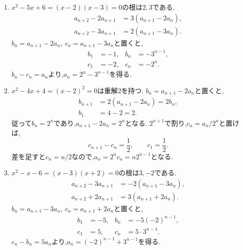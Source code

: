     \noindent{}\par\nobreak
    \begin{enumerate}[label=(\arabic*),parsep=3pt,format=\bookitemlink{example-three-term-1}{solution}{problem}]
      \item {}$x^2-5x+6=(x-2)(x-3)=0$の根は$2,3$である.
            \begin{align*}
              a_{n+2}-2a_{n+1}&=3(a_{n+1}-2a_n),\\
              a_{n+2}-3a_{n+1}&=2(a_{n+1}-3a_n).
            \end{align*}
            $b_n=a_{n+1}-2a_n,\ c_n=a_{n+1}-3a_n$と置くと,
            \[
              \begin{aligned}
                b_1&=-1,& b_n&=-3^{n-1},\\
                c_1&=-2,& c_n&=-2^n.
              \end{aligned}
            \]
            $b_n-c_n=a_n$より,$a_n=2^n-3^{n-1}$を得る.
      \item {}$x^2-4x+4=(x-2)^2=0$は重解$2$を持つ.
            $b_n=a_{n+1}-2a_n$と置くと,
            \[
              \begin{aligned}
                b_{n+1}&=2(a_{n+1}-2a_n)=2b_n,\\
                b_1&=4-2=2.
              \end{aligned}
            \]
            従って$b_n=2^n$であり,$a_{n+1}-2a_n=2^n$となる.
            $2^{n+1}$で割り,$c_n=a_n/2^n$と置けば,
            \[
              c_{n+1}-c_n=\frac12,\qquad c_1=\frac12.
            \]
            差を足すと$c_n=n/2$なので,$a_n=2^nc_n=n2^{n-1}$となる.
      \item {}$x^2-x-6=(x-3)(x+2)=0$の根は$3,-2$である.
            \begin{align*}
              a_{n+2}-3a_{n+1}&=-2(a_{n+1}-3a_n),\\
              a_{n+2}+2a_{n+1}&=3(a_{n+1}+2a_n).
            \end{align*}
            $b_n=a_{n+1}-3a_n,\ c_n=a_{n+1}+2a_n$と置くと,
            \[
              \begin{aligned}
                b_1&=-5,& b_n&=-5(-2)^{n-1},\\
                c_1&=5,& c_n&=5\cdot3^{n-1}.
              \end{aligned}
            \]
            $c_n-b_n=5a_n$より,$a_n=(-2)^{n-1}+3^{n-1}$を得る.
    \end{enumerate}

